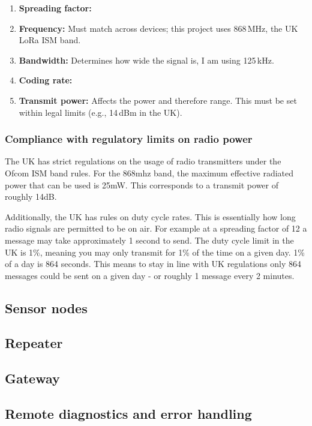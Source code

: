 \begin{enumerate}
  \item \textbf{Spreading factor:}
  \item \textbf{Frequency:} Must match across devices; this project uses
        868\,MHz, the UK LoRa ISM band.
  \item \textbf{Bandwidth:} Determines how wide the signal is, I am using
        125\,kHz.
  \item \textbf{Coding rate:}
  \item \textbf{Transmit power:} Affects the power and therefore range. This
        must be set within legal limits (e.g., 14\,dBm in the UK).
\end{enumerate}

\subsubsection{Compliance with regulatory limits on radio power}\label{sec:lora-limit}

The UK has strict regulations on the usage of radio transmitters under the Ofcom
ISM band rules. For the 868mhz band, the maximum effective radiated power that
can be used is 25mW. This corresponds to a transmit power of roughly 14dB.

Additionally, the UK has rules on duty cycle rates. This is essentially how long
radio signals are permitted to be on air. For example at a spreading factor of
12 a message may take approximately 1 second to send. The duty cycle limit in
the UK is 1\%, meaning you may only transmit for 1\% of the time on a given day.
1\% of a day is 864 seconds. This means to stay in line with UK regulations only
864 messages could be sent on a given day - or roughly 1 message every 2
minutes.


\subsection{Sensor nodes}

\subsection{Repeater}

\subsection{Gateway}

\subsection{Remote diagnostics and error handling}

